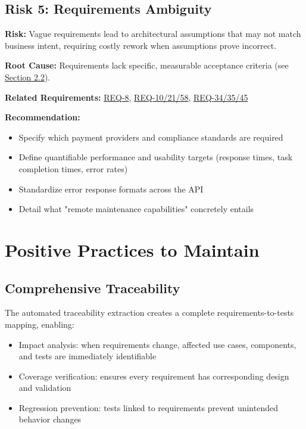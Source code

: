 \documentclass[11pt,a4paper]{article}
\begin{document}
\subsection{Risk 5: Requirements Ambiguity}
\label{risk:requirements}

\textbf{Risk:} Vague requirements lead to architectural assumptions that may not match business intent, requiring costly rework when assumptions prove incorrect.

\textbf{Root Cause:} Requirements lack specific, measurable acceptance criteria (see \hyperref[sec:req-quality]{Section 2.2}).

\textbf{Related Requirements:} \hyperref[req:payment-methods]{REQ-8}, \hyperref[req:performance-metrics]{REQ-10/21/58}, \hyperref[req:error-formats]{REQ-34/35/45}

\textbf{Recommendation:}
\begin{itemize}
    \item Specify which payment providers and compliance standards are required
    \item Define quantifiable performance and usability targets (response times, task completion times, error rates)
    \item Standardize error response formats across the API
    \item Detail what "remote maintenance capabilities" concretely entails
\end{itemize}

\section{Positive Practices to Maintain}

\subsection{Comprehensive Traceability}

The automated traceability extraction creates a complete requirements-to-tests mapping, enabling:
\begin{itemize}
    \item Impact analysis: when requirements change, affected use cases, components, and tests are immediately identifiable
    \item Coverage verification: ensures every requirement has corresponding design and validation
    \item Regression prevention: tests linked to requirements prevent unintended behavior changes
\end{itemize}
\end{document}
